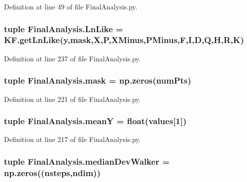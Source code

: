 Definition at line 49 of file Final\-Analysis.\-py.

\hypertarget{namespace_final_analysis_a887a21357f13ebf746beb132e8508849}{
\subsubsection[{Ln\-Like}]{\setlength{\rightskip}{0pt plus 5cm}tuple Final\-Analysis.\-Ln\-Like = K\-F.\-get\-Ln\-Like({\bf y},{\bf mask},X,P,X\-Minus,P\-Minus,F,I,D,Q,H,R,K)}}\label{namespace_final_analysis_a887a21357f13ebf746beb132e8508849}


Definition at line 237 of file Final\-Analysis.\-py.

\hypertarget{namespace_final_analysis_a94fb4e8e60fe4cb0595dee2bbaf20c81}{
\subsubsection[{mask}]{\setlength{\rightskip}{0pt plus 5cm}tuple Final\-Analysis.\-mask = np.\-zeros({\bf num\-Pts})}}\label{namespace_final_analysis_a94fb4e8e60fe4cb0595dee2bbaf20c81}


Definition at line 221 of file Final\-Analysis.\-py.

\hypertarget{namespace_final_analysis_a1c2fa47f2afa602b9c2d25ec8580ff42}{
\subsubsection[{mean\-Y}]{\setlength{\rightskip}{0pt plus 5cm}tuple Final\-Analysis.\-mean\-Y = float({\bf values}\mbox{[}1\mbox{]})}}\label{namespace_final_analysis_a1c2fa47f2afa602b9c2d25ec8580ff42}


Definition at line 217 of file Final\-Analysis.\-py.

\hypertarget{namespace_final_analysis_ac362b5ee700f3dc97ef8f58b9c95f019}{
\subsubsection[{median\-Dev\-Walker}]{\setlength{\rightskip}{0pt plus 5cm}tuple Final\-Analysis.\-median\-Dev\-Walker = np.\-zeros(({\bf nsteps},{\bf ndim}))}}\label{namespace_final_analysis_ac362b5ee700f3dc97ef8f58b9c95f019}


